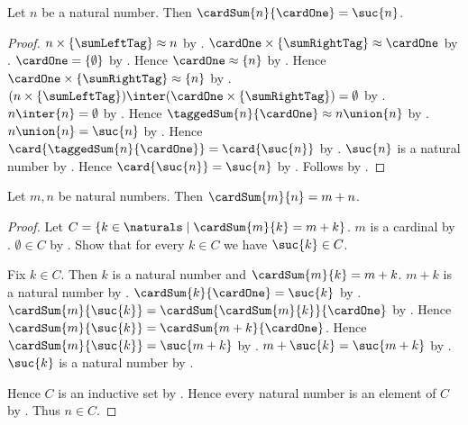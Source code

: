 \begin{proposition}\label{cardinal_sum_natural_successor}
    Let $n$ be a natural number.
    Then $\cardSum{n}{\cardOne}=\suc{n}$.
\end{proposition}
\begin{proof}
    $n\times\{\sumLeftTag\}\approx n$
        by .
    $\cardOne\times\{\sumRightTag\}\approx\cardOne$
        by .
    $\cardOne=\{\emptyset\}$
        by .
    Hence $\cardOne\approx\{n\}$ by .
    Hence $\cardOne\times\{\sumRightTag\}\approx\{n\}$
        by .
    $(n\times\{\sumLeftTag\})\inter
        (\cardOne\times\{\sumRightTag\})=\emptyset$
        by .
    $n\inter\{n\}=\emptyset$
        by .
    Hence $\taggedSum{n}{\cardOne}\approx n\union\{n\}$
        by .
    $n\union\{n\}=\suc{n}$
        by .
    Hence $\card{\taggedSum{n}{\cardOne}}=\card{\suc{n}}$
        by .
    $\suc{n}$ is a natural number by .
    Hence $\card{\suc{n}}=\suc{n}$
        by .
    Follows by .
\end{proof}

\begin{theorem}\label{cardinal_sum_natural_numbers}
    Let $m,n$ be natural numbers.
    Then $\cardSum{m}{n}=m+n$.
\end{theorem}
\begin{proof}
    Let $C=\{k\in\naturals\mid
        \text{$\cardSum{m}{k}=m+k$}\}$.
    $m$ is a cardinal by .
    $\emptyset\in C$
        by
        .
    Show that for every $k\in C$ we have $\suc{k}\in C$.
    \begin{subproof}
        Fix $k\in C$.
        Then $k$ is a natural number and
            $\cardSum{m}{k}=m+k$.
        $m+k$ is a natural number by .
        $\cardSum{k}{\cardOne}=\suc{k}$
            by .
        $\cardSum{m}{\suc{k}}
            =\cardSum{\cardSum{m}{k}}{\cardOne}$
            by .
        Hence $\cardSum{m}{\suc{k}}
            =\cardSum{m+k}{\cardOne}$.
        Hence $\cardSum{m}{\suc{k}}=\suc{m+k}$
            by .
        $m+\suc{k}=\suc{m+k}$
            by .
        $\suc{k}$ is a natural number by .
    \end{subproof}
    Hence $C$ is an inductive set by .
    Hence every natural number is an element of $C$
        by .
    Thus $n\in C$.
\end{proof}

